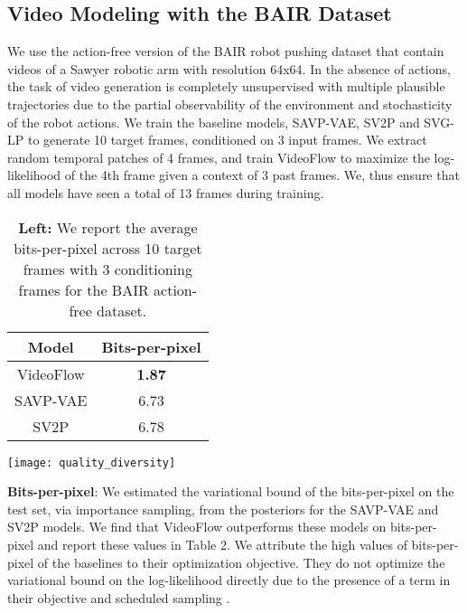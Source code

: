 \documentclass{article} \usepackage{iclr2020_conference,times}
\begin{document}
\subsection{Video Modeling with the BAIR Dataset}

\label{sec:svgb}

We use the action-free version of the BAIR robot pushing dataset \citep{ebert2017self} that contain videos of a Sawyer robotic arm with resolution 64x64. In the absence of actions, the task of video generation is completely unsupervised with multiple plausible trajectories due to the partial observability of the environment and stochasticity of the robot actions. We train the baseline models, SAVP-VAE, SV2P and SVG-LP to generate 10 target frames, conditioned on 3 input frames. We extract random temporal patches of 4 frames, and train VideoFlow to maximize the log-likelihood of the 4th frame given a context of 3 past frames. We, thus ensure that all models have seen a total of 13 frames during training.

\begin{table}
	\begin{minipage}{0.5\linewidth}
		\centering
		\begin{tabular}{c c}
        \hline
        Model & Bits-per-pixel \\
        \hline\hline
        VideoFlow & \textbf{1.87} \\
        SAVP-VAE &  6.73 \\
        SV2P &  6.78 \\ 
        \hline
        \end{tabular}
		\caption{\textbf{Left:} We report the average bits-per-pixel across 10 target frames with 3 conditioning frames for the BAIR action-free dataset.}
	\end{minipage}\hfill
	\begin{minipage}{0.45\linewidth}
		\centering
		\texttt{[image: quality\_diversity]}
	\end{minipage}
\label{tab:bair_bpp_diversity}
\end{table}



\textbf{Bits-per-pixel}: We estimated the variational bound of the bits-per-pixel on the test set, via importance sampling, from the posteriors for the SAVP-VAE and SV2P models. We find that VideoFlow outperforms these models on bits-per-pixel and report these values in Table 2. We attribute the high values of bits-per-pixel of the baselines to their optimization objective. They do not optimize the variational bound on the log-likelihood directly due to the presence of a  term in their objective and scheduled sampling \citep{bengio2015scheduled}.
\end{document}
